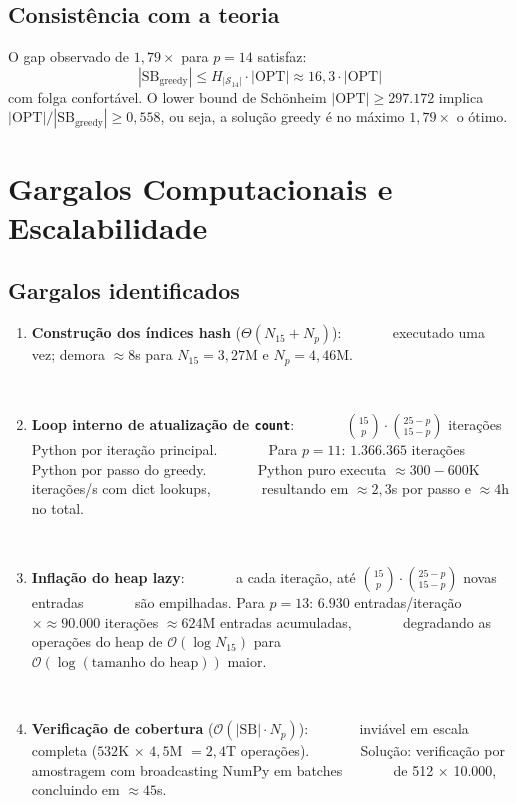 \documentclass[12pt,a4paper]{article}
\theoremstyle{definition}
\newcommand{\bigo}[1]{\mathcal{O}\!\left(#1\right)}
\newcommand{\bigtheta}[1]{\Theta\!\left(#1\right)}
\newcommand{\C}[2]{\binom{#1}{#2}}
\newcommand{\SB}{\mathrm{SB}}
\newcommand{\OPT}{\mathrm{OPT}}
\newcommand{\Harm}[1]{H_{#1}}
\begin{document}
\subsection{Consistência com a teoria}

O gap observado de $1{,}79\times$ para $p=14$ satisfaz:
\[
  |\SB_{\text{greedy}}| \leq \Harm{|\mathcal{S}_{14}|} \cdot |\OPT|
  \approx 16{,}3 \cdot |\OPT|
\]
com folga confortável. O lower bound de Schönheim $|\OPT| \geq 297.172$
implica $|\OPT| / |\SB_{\text{greedy}}| \geq 0{,}558$, ou seja, a solução
greedy é no máximo $1{,}79\times$ o ótimo.

\section{Gargalos Computacionais e Escalabilidade}

\subsection{Gargalos identificados}

\begin{enumerate}
  \item \textbf{Construção dos índices hash} ($\bigtheta{N_{15} + N_p}$):
        executado uma vez; demora $\approx 8$s para $N_{15} = 3{,}27$M e $N_p = 4{,}46$M.

  \item \textbf{Loop interno de atualização de \texttt{count}}:
        $\C{15}{p} \cdot \C{25-p}{15-p}$ iterações Python por iteração principal.
        Para $p=11$: $1.366.365$ iterações Python por passo do greedy.
        Python puro executa $\approx 300{-}600$K iterações/s com dict lookups,
        resultando em $\approx 2{,}3$s por passo e $\approx 4$h no total.

  \item \textbf{Inflação do heap lazy}:
        a cada iteração, até $\C{15}{p}\cdot\C{25-p}{15-p}$ novas entradas
        são empilhadas. Para $p=13$: $6.930$ entradas/iteração
        $\times \approx 90.000$ iterações $\approx 624$M entradas acumuladas,
        degradando as operações do heap de $\bigo{\log N_{15}}$ para
        $\bigo{\log(\text{tamanho do heap})}$ maior.

  \item \textbf{Verificação de cobertura} ($\bigo{|\SB| \cdot N_p}$):
        inviável em escala completa ($532$K $\times$ $4{,}5$M $= 2{,}4$T operações).
        Solução: verificação por amostragem com broadcasting NumPy em batches
        de 512 $\times$ 10.000, concluindo em $\approx 45$s.
\end{enumerate}
\end{document}
